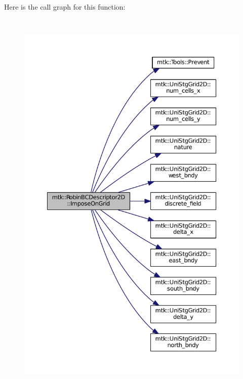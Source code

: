 Here is the call graph for this function\+:\nopagebreak
\begin{figure}[H]
\begin{center}
\leavevmode
\includegraphics[height=550pt]{classmtk_1_1RobinBCDescriptor2D_ac9564bc46c196cbf4720a0e4b93da8b0_cgraph}
\end{center}
\end{figure}


